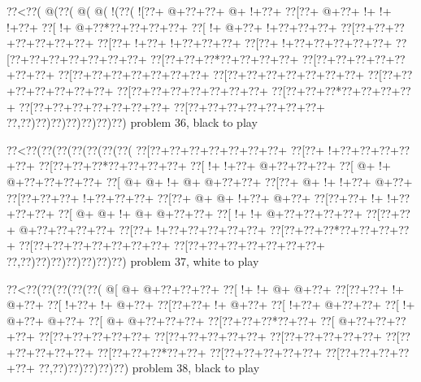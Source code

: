 \vbox{\vbox{\goo
\0??<\0??(\- @(\0??(\- @(\- @(\- !(\0??(
\- ![\0??+\- @+\0??+\0??+\- @+\- !+\0??+
\0??[\0??+\- @+\0??+\- !+\- !+\- !+\0??+
\0??[\- !+\- @+\0??*\0??+\0??+\0??+\0??+
\0??[\- !+\- @+\0??+\- !+\0??+\0??+\0??+
\0??[\0??+\0??+\0??+\0??+\0??+\0??+\0??+
\0??[\0??+\- !+\0??+\- !+\0??+\0??+\0??+
\0??[\0??+\- !+\0??+\0??+\0??+\0??+\0??+
\0??[\0??+\0??+\0??+\0??+\0??+\0??+\0??+
\0??[\0??+\0??+\0??*\0??+\0??+\0??+\0??+
\0??[\0??+\0??+\0??+\0??+\0??+\0??+\0??+
\0??[\0??+\0??+\0??+\0??+\0??+\0??+\0??+
\0??[\0??+\0??+\0??+\0??+\0??+\0??+\0??+
\0??[\0??+\0??+\0??+\0??+\0??+\0??+\0??+
\0??[\0??+\0??+\0??+\0??+\0??+\0??+\0??+
\0??[\0??+\0??+\0??*\0??+\0??+\0??+\0??+
\0??[\0??+\0??+\0??+\0??+\0??+\0??+\0??+
\0??[\0??+\0??+\0??+\0??+\0??+\0??+\0??+
\0??,\0??)\0??)\0??)\0??)\0??)\0??)\0??)
}
\hfil problem 36, black to play\hfil\break
}

\vbox{\vbox{\goo
\0??<\0??(\0??(\0??(\0??(\0??(\0??(\0??(
\0??[\0??+\0??+\0??+\0??+\0??+\0??+\0??+
\0??[\0??+\- !+\0??+\0??+\0??+\0??+\0??+
\0??[\0??+\0??+\0??*\0??+\0??+\0??+\0??+
\0??[\- !+\- !+\0??+\- @+\0??+\0??+\0??+
\0??[\- @+\- !+\- @+\0??+\0??+\0??+\0??+
\0??[\- @+\- @+\- !+\- @+\- @+\0??+\0??+
\0??[\0??+\- @+\- !+\- !+\0??+\- @+\0??+
\0??[\0??+\0??+\0??+\- !+\0??+\0??+\0??+
\0??[\0??+\- @+\- @+\- !+\0??+\- @+\0??+
\0??[\0??+\0??+\- !+\- !+\0??+\0??+\0??+
\0??[\- @+\- @+\- !+\- @+\- @+\0??+\0??+
\0??[\- !+\- !+\- @+\0??+\0??+\0??+\0??+
\0??[\0??+\0??+\- @+\0??+\0??+\0??+\0??+
\0??[\0??+\- !+\0??+\0??+\0??+\0??+\0??+
\0??[\0??+\0??+\0??*\0??+\0??+\0??+\0??+
\0??[\0??+\0??+\0??+\0??+\0??+\0??+\0??+
\0??[\0??+\0??+\0??+\0??+\0??+\0??+\0??+
\0??,\0??)\0??)\0??)\0??)\0??)\0??)\0??)
}
\hfil problem 37, white to play\hfil\break
}

\vbox{\vbox{\goo
\0??<\0??(\0??(\0??(\0??(\0??(
\- @[\- @+\- @+\0??+\0??+\0??+
\0??[\- !+\- !+\- @+\- @+\0??+
\0??[\0??+\0??+\- !+\- @+\0??+
\0??[\- !+\0??+\- !+\- @+\0??+
\0??[\0??+\0??+\- !+\- @+\0??+
\0??[\- !+\0??+\- @+\0??+\0??+
\0??[\- !+\- @+\0??+\- @+\0??+
\0??[\- @+\- @+\0??+\0??+\0??+
\0??[\0??+\0??+\0??*\0??+\0??+
\0??[\- @+\0??+\0??+\0??+\0??+
\0??[\0??+\0??+\0??+\0??+\0??+
\0??[\0??+\0??+\0??+\0??+\0??+
\0??[\0??+\0??+\0??+\0??+\0??+
\0??[\0??+\0??+\0??+\0??+\0??+
\0??[\0??+\0??+\0??*\0??+\0??+
\0??[\0??+\0??+\0??+\0??+\0??+
\0??[\0??+\0??+\0??+\0??+\0??+
\0??,\0??)\0??)\0??)\0??)\0??)
}
\hfil problem 38, black to play\hfil\break
}

